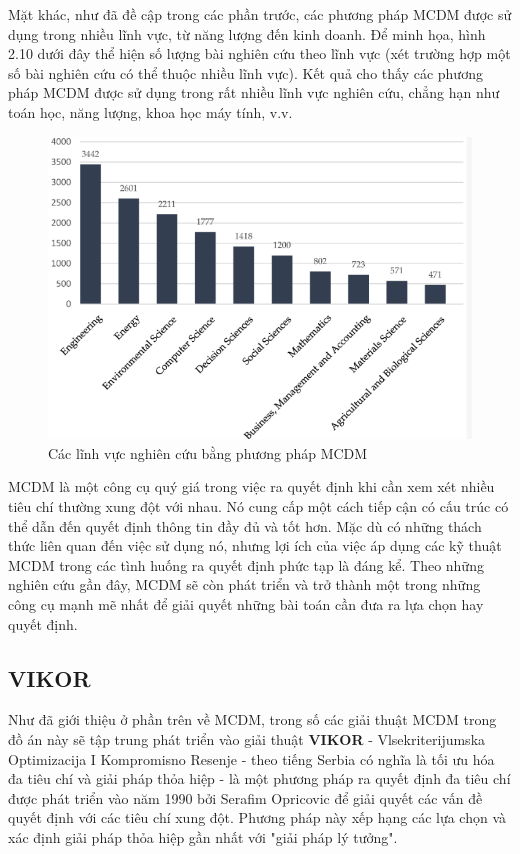 Mặt khác, như đã đề cập trong các phần trước, các phương pháp MCDM được sử dụng trong nhiều lĩnh vực, từ năng lượng đến kinh doanh. Để minh họa, hình 2.10 dưới đây thể hiện số lượng bài nghiên cứu theo lĩnh vực (xét trường hợp một số bài nghiên cứu có thể thuộc nhiều lĩnh vực). Kết quả cho thấy các phương pháp MCDM được sử dụng trong rất nhiều lĩnh vực nghiên cứu, chẳng hạn như toán học, năng lượng, khoa học máy tính, v.v.
\begin{figure}[H]
    \centering
    \includegraphics[width=0.65\linewidth]{images/MCDMarea.png}
    \vspace{0.6cm}
    \caption{Các lĩnh vực nghiên cứu bằng phương pháp MCDM}
\end{figure}

MCDM là một công cụ quý giá trong việc ra quyết định khi cần xem xét nhiều tiêu chí thường xung đột với nhau. Nó cung cấp một cách tiếp cận có cấu trúc có thể dẫn đến quyết định thông tin đầy đủ và tốt hơn. Mặc dù có những thách thức liên quan đến việc sử dụng nó, nhưng lợi ích của việc áp dụng các kỹ thuật MCDM trong các tình huống ra quyết định phức tạp là đáng kể. Theo những nghiên cứu gần đây, MCDM sẽ còn phát triển và trở thành một trong những công cụ mạnh mẽ nhất để giải quyết những bài toán cần đưa ra lựa chọn hay quyết định.

\subsection{VIKOR}

Như đã giới thiệu ở phần trên về MCDM, trong số các giải thuật MCDM trong đồ án này sẽ tập trung phát triển vào giải thuật \textbf{VIKOR} - Vlsekriterijumska Optimizacija I Kompromisno Resenje - theo tiếng Serbia có nghĩa là tối ưu hóa đa tiêu chí và giải pháp thỏa hiệp - là một phương pháp ra quyết định đa tiêu chí được phát triển vào năm 1990 bởi Serafim Opricovic để giải quyết các vấn đề quyết định với các tiêu chí xung đột. Phương pháp này xếp hạng các lựa chọn và xác định giải pháp thỏa hiệp gần nhất với "giải pháp lý tưởng".

